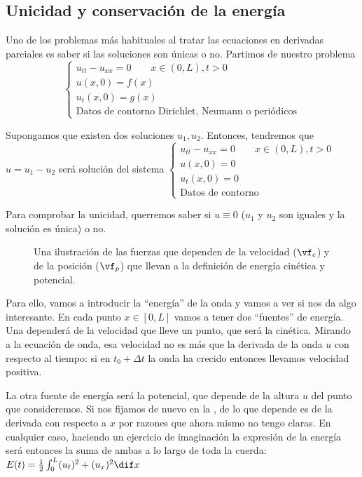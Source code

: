 	\subsection{Unicidad y conservación de la energía}

		Uno de los problemas más habituales al tratar las ecuaciones en derivadas parciales es saber si las soluciones son únicas o no. Partimos de nuestro problema
		\[ \begin{cases}
			u_{tt}-u_{xx} = 0\qquad x \in (0,L), t >0 \\
			u(x,0) = f(x) 	\\
			u_t(x,0) = g(x) \\
			\text{Datos de contorno Dirichlet, Neumann o periódicos}
		\end{cases} \]

		Supongamos que existen dos soluciones $u_1, u_{2}$. Entonces, tendremos que $u = u_1 - u_2$ será solución del sistema
		\( \begin{cases}
			u_{tt}-u_{xx} = 0\qquad x \in (0,L), t >0 \\
			u(x,0) = 0 	\\
			u_t(x,0) = 0 \\
			\text{Datos de contorno}
		\end{cases} \label{eq:Onda:ProblemaUnicidad} \)

		Para comprobar la unicidad, querremos saber si $u \equiv 0$ ($u_1$ y $u_2$ son iguales y la solución es única) o no.

		\begin{figure}[hbtp]
		\centering
		\caption{Una ilustración de las fuerzas que dependen de la velocidad ($\vf_c$) y de la posición ($\vf_p$) que llevan a la definición de energía cinética y potencial.}
		\label{fig:EnergiaOnda}
		\end{figure}

		Para ello, vamos a introducir la ``energía'' de la onda y vamos a ver si nos da algo interesante. En cada punto $x ∈ [0,L]$ vamos a tener dos ``fuentes'' de energía. Una dependerá de la velocidad que lleve un punto, que será la cinética. Mirando a la ecuación de onda, esa velocidad no es más que la derivada de la onda $u$ con respecto al tiempo: si en $t_0 + Δt$ la onda ha crecido entonces llevamos velocidad positiva.

		La otra fuente de energía será la potencial, que depende de la altura $u$ del punto que consideremos. Si nos fijamos de nuevo en la , de lo que depende es de la derivada con respecto a $x$ por razones que ahora mismo no tengo claras. En cualquier caso, haciendo un ejercicio de imaginación la expresión de la energía será entonces la suma de ambas a lo largo de toda la cuerda:
		\( E(t) = \frac{1}{2} \int_0^L (u_t)^2 + (u_x)^2 \dif x \label{eq:Onda:Energia} \)

